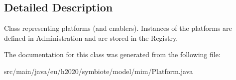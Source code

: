 \subsection{Detailed Description}
Class representing platforms (and enablers). Instances of the platforms are defined in Administration and are stored in the Registry. 

The documentation for this class was generated from the following file\+:\begin{DoxyCompactItemize}
\item 
src/main/java/eu/h2020/symbiote/model/mim/Platform.\+java\end{DoxyCompactItemize}
